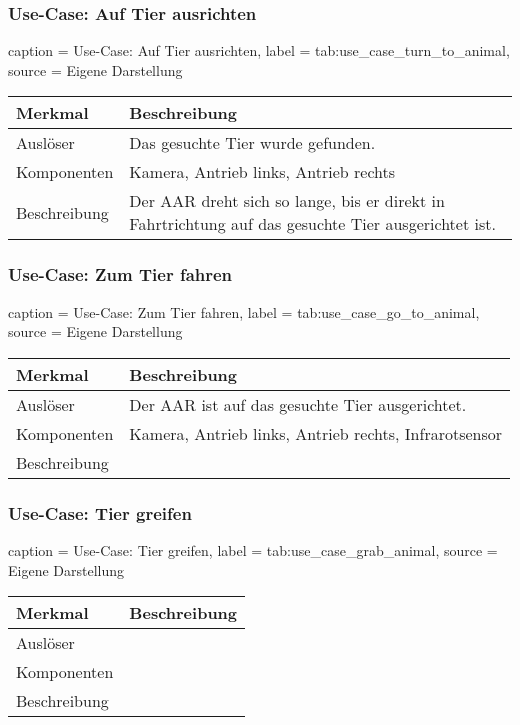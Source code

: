 \subsubsection{Use-Case: Auf Tier ausrichten}

\begin{dhbwtable}{%
    caption	= Use-Case: Auf Tier ausrichten,
    label	= tab:use_case_turn_to_animal,
    source	= Eigene Darstellung
}
    \begin{tabular}{ll}
        \toprule
        \textbf{Merkmal}     & \textbf{Beschreibung}  \\\midrule
        Auslöser     & Das gesuchte Tier wurde gefunden.\\
        Komponenten  & Kamera, Antrieb links, Antrieb rechts\\
        Beschreibung & Der \ac{AAR} dreht sich so lange, bis er direkt in Fahrtrichtung auf das gesuchte Tier ausgerichtet ist.\\\bottomrule
    \end{tabular}    
\end{dhbwtable}

\subsubsection{Use-Case: Zum Tier fahren}

\begin{dhbwtable}{%
    caption	= Use-Case: Zum Tier fahren,
    label	= tab:use_case_go_to_animal,
    source	= Eigene Darstellung
}
    \begin{tabular}{ll}
        \toprule
        \textbf{Merkmal}     & \textbf{Beschreibung}  \\\midrule
        Auslöser     & Der \ac{AAR} ist auf das gesuchte Tier ausgerichtet.\\
        Komponenten  & Kamera, Antrieb links, Antrieb rechts, Infrarotsensor\\
        Beschreibung & \\\bottomrule
    \end{tabular}    
\end{dhbwtable}

\subsubsection{Use-Case: Tier greifen}

\begin{dhbwtable}{%
    caption	= Use-Case: Tier greifen,
    label	= tab:use_case_grab_animal,
    source	= Eigene Darstellung
}
    \begin{tabular}{ll}
        \toprule
        \textbf{Merkmal}     & \textbf{Beschreibung}  \\\midrule
        Auslöser     &\\
        Komponenten  & \\
        Beschreibung & \\\bottomrule
    \end{tabular}    
\end{dhbwtable}

